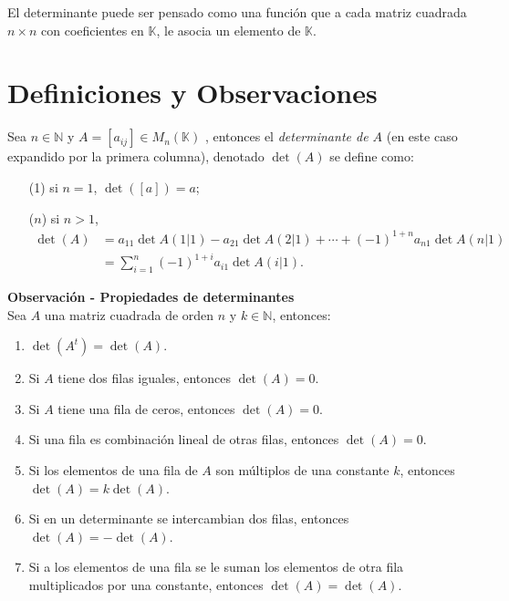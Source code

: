 \documentclass{article}
\newenvironment{remark}[2][Observación]
    { \begin{mdframed}[backgroundcolor=yellow!20] \textbf{#1 #2} \\}
    {  \end{mdframed}}
\begin{document}
\begin{mdframed}[backgroundcolor=gray!40,shadow=true,roundcorner=8pt]
    El determinante puede ser pensado como una función que a cada matriz cuadrada $n \times n$ con coeficientes en $\mathbb{K}$,  le asocia un elemento de $\mathbb{K}$.
\end{mdframed}

\section*{Definiciones y Observaciones}
Sea $n \in \mathbb{N}$ y $A =[a_{ij}] \in M_n(\mathbb{K})$ , entonces el \textit{determinante de $A$} (en este caso expandido por la primera columna), denotado $\det(A)$ se define como:
        \begin{enumerate}
            \item[(1)] si $n=1$,  $\det([a]) =a$;
            \item[($n$)] si $n >1$, 
            \begin{align*}
            \det(A) &=  a_{11}\det A(1|1) - a_{21}\det A(2|1) + \cdots + (-1)^{1+n}  a_{n1}\det A(n|1) \\
            &= \sum_{i=1}^{n} (-1)^{1+i}  a_{i1}\det A(i|1).
            \end{align*}
        \end{enumerate}

\begin{remark}{- Propiedades de determinantes}
Sea $A$ una matriz cuadrada de orden $n$ y $k \in \mathbb{N}$, entonces:
\begin{enumerate}
    \item $\det(A^t) = \det(A)$.
    \item Si $A$ tiene dos filas iguales, entonces $\det(A) = 0$.
    \item Si $A$ tiene una fila de ceros, entonces $\det(A) = 0$.
    \item Si una fila es combinación lineal de otras filas, entonces $\det(A) = 0$.
    \item Si los elementos de una fila de $A$ son múltiplos de una constante $k$, entonces $\det(A) = k\det(A)$.
    \item Si en un determinante se intercambian dos filas, entonces $\det(A) = -\det(A)$.
    \item Si a los elementos de una fila se le suman los elementos de otra fila multiplicados por una constante, entonces $\det(A) = \det(A)$. 
\end{enumerate}
\end{remark}
\end{document}
